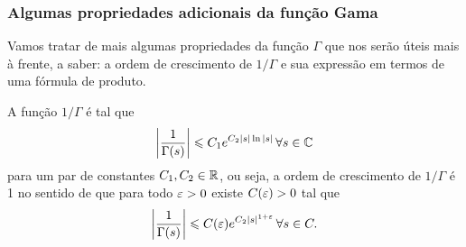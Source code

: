     \subsubsection*{Algumas propriedades adicionais da função Gama}
    Vamos tratar de mais algumas propriedades da função $\Gamma$ que nos
    serão úteis mais à frente, a saber: a ordem de crescimento de $1/\Gamma$
    e sua expressão em termos de uma fórmula de produto.
    \begin{teorema}
    \label{teo-ordem-cresc-inv-gama}
        A função $1/\Gamma$ é tal que
        \[
        \left| \frac{1}{\Gamma(s)} \right| \leqslant C_1e^{C_2|s|\ln|s|} \, \forall s\in \mathbb{C}
        \]
        para um par de constantes $C_1,C_2\in\mathbb{R}$,
        ou seja, a ordem de crescimento de $1/\Gamma$ é 1 no sentido de que
        para todo $\varepsilon>0$ existe $C(\varepsilon)>0$ tal que
        \[
        \left| \frac{1}{\Gamma(s)} \right| \leqslant C(\varepsilon)e^{C_2|s|^{1+\varepsilon}} \, \forall s\in C.
        \]
    \end{teorema}
